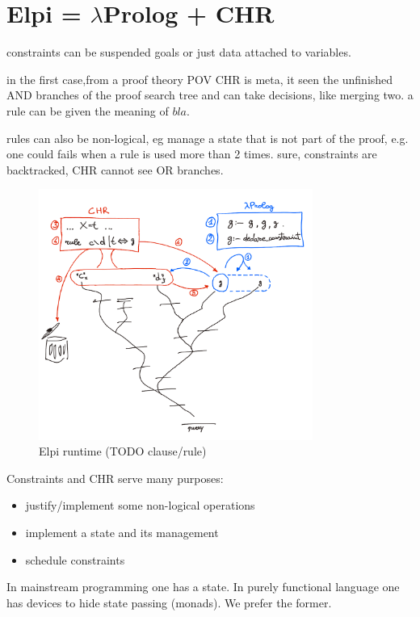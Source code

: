 \documentclass[a4paper, 11pt]{book}
\begin{document}
\section{Elpi = $\lambda$Prolog + CHR}



constraints can be suspended goals or just data attached to variables.

in the first case,from a proof theory POV CHR is meta, it seen the unfinished AND
branches of the proof search tree and can take decisions, like merging two. a rule can
be given the meaning of $bla$. 

rules can also be non-logical, eg manage a state that is not part of 
the proof, e.g. one could fails when a rule is used more than 2 times.
sure, constraints are backtracked, CHR cannot see OR branches.

\begin{figure}
  \includegraphics[width=0.8\textwidth]{chr.png}
  \caption{\label{chr:fig}Elpi runtime (TODO clause/rule)}
\end{figure}
 
Constraints and CHR serve many purposes:
\begin{itemize}
  \item justify/implement some non-logical operations
  \item implement a state and its management
  \item schedule constraints
\end{itemize}

In mainstream programming one has a state. In purely functional language
one has devices to hide state passing (monads). We prefer the former.
\end{document}
